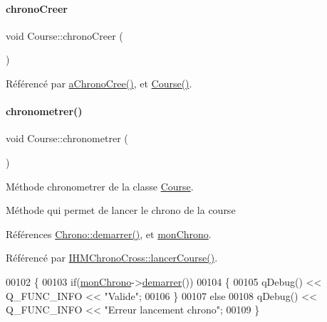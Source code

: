 \mbox{\label{class_course_a1c7830a51af59f70998ff0576f0aa7cd}} 
\paragraph{\texorpdfstring{chrono\+Creer}{chronoCreer}}
{\footnotesize\ttfamily void Course\+::chrono\+Creer (\begin{DoxyParamCaption}{ }\end{DoxyParamCaption})\hspace{0.3cm}{\ttfamily [signal]}}



Référencé par \hyperlink{class_course_ada484058a0180a31a98ee77c4fad93f8}{a\+Chrono\+Cree()}, et \hyperlink{class_course_af6317ecab95f8a2eb205b4f91b530992}{Course()}.

\mbox{\label{class_course_a589447dd63dca89395119ffd4e4a8c8c}} 
\paragraph{\texorpdfstring{chronometrer()}{chronometrer()}}
{\footnotesize\ttfamily void Course\+::chronometrer (\begin{DoxyParamCaption}{ }\end{DoxyParamCaption})}



Méthode chronometrer de la classe \hyperlink{class_course}{Course}. 

Méthode qui permet de lancer le chrono de la course 

Références \hyperlink{class_chrono_a2ee875c24eb14f09011a40dfb3f1921f}{Chrono\+::demarrer()}, et \hyperlink{class_course_a0c9b246b0f1ec612bd6e6c613a94d52b}{mon\+Chrono}.



Référencé par \hyperlink{class_i_h_m_chrono_cross_ace90922ce4c4ffeed6f1e8eb84c8c7a5}{I\+H\+M\+Chrono\+Cross\+::lancer\+Course()}.


\begin{DoxyCode}
00102 \{
00103     \textcolor{keywordflow}{if}(\hyperlink{class_course_a0c9b246b0f1ec612bd6e6c613a94d52b}{monChrono}->\hyperlink{class_chrono_a2ee875c24eb14f09011a40dfb3f1921f}{demarrer}())
00104     \{
00105         qDebug() << Q\_FUNC\_INFO << \textcolor{stringliteral}{"Valide"};
00106     \}
00107     \textcolor{keywordflow}{else}
00108         qDebug() << Q\_FUNC\_INFO << \textcolor{stringliteral}{"Erreur lancement chrono"};
00109 \}
\end{DoxyCode}
\mbox{\label{class_course_a178f2015d20ef5d838564671567f6831}} 
